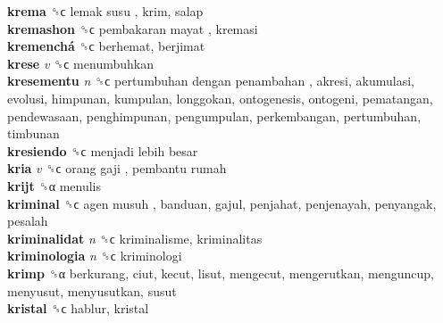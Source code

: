 \textbf{krema} ␝ϲ   lemak susu , krim, salap  \\
\textbf{kremashon} ␝ϲ   pembakaran mayat , kremasi  \\
\textbf{kremenchá} ␝ϲ  berhemat, berjimat  \\
\textbf{krese} \emph{v}  ␝ϲ  menumbuhkan  \\
\textbf{kresementu} \emph{n}  ␝ϲ   pertumbuhan dengan penambahan , akresi, akumulasi, evolusi, himpunan, kumpulan, longgokan, ontogenesis, ontogeni, pematangan, pendewasaan, penghimpunan, pengumpulan, perkembangan, pertumbuhan, timbunan  \\
\textbf{kresiendo} ␝ϲ   menjadi lebih besar   \\
\textbf{kria} \emph{v}  ␝ϲ   orang gaji ,  pembantu rumah   \\
\textbf{krijt} ␝α  menulis  \\
\textbf{kriminal} ␝ϲ   agen musuh , banduan, gajul, penjahat, penjenayah, penyangak, pesalah  \\
\textbf{kriminalidat} \emph{n}  ␝ϲ  kriminalisme, kriminalitas  \\
\textbf{kriminologia} \emph{n}  ␝ϲ  kriminologi  \\
\textbf{krimp} ␝α  berkurang, ciut, kecut, lisut, mengecut, mengerutkan, menguncup, menyusut, menyusutkan, susut  \\
\textbf{kristal} ␝ϲ  hablur, kristal  \\
